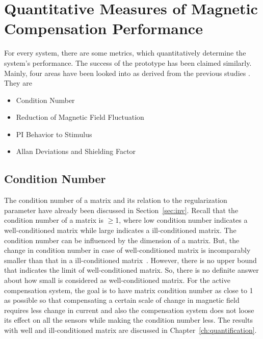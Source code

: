 

 
 
% 

\FloatBarrier




\section{Quantitative Measures of Magnetic Compensation Performance\label{sec:metrics}}
For every system, there are some metrics, which quantitatively determine the system's performance. The success of the prototype has been claimed similarly. Mainly, four areas have been looked into as derived from the previous studies \cite{bea,lins,rawlik}. They are

\begin{itemize}
    \item Condition Number
    \item Reduction of Magnetic Field Fluctuation
    \item PI Behavior to Stimulus
    \item Allan Deviations and Shielding Factor

\end{itemize}
\subsection{Condition Number}
The condition number of a matrix and its relation to the regularization parameter have already been discussed in Section~\ref{sec:inv}. Recall that the condition number of a matrix is $\geq$1, where low condition number indicates a well-conditioned matrix while large indicates a ill-conditioned matrix.  The condition number can be influenced by the dimension of a matrix. But, the change in condition number in case of  well-conditioned matrix is incomparably smaller than that in a ill-conditioned matrix~\cite{cond_m_size}. However, there is no upper bound that indicates the limit of well-conditioned matrix. So, there is no definite answer about how small is considered as well-conditioned matrix. For the active compensation system, the goal is to have matrix condition number as close to 1 as possible so that compensating a certain scale of change in magnetic field requires less change in current and also the compensation system does not loose its effect on all the sensors while making the condition number less. The results with well and ill-conditioned matrix are discussed in Chapter~\ref{ch:quantification}.

